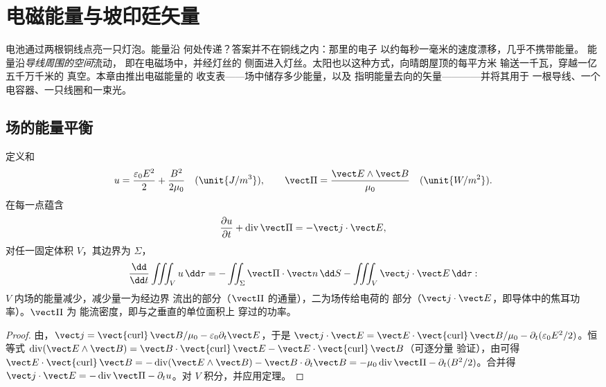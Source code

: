 \chapter{电磁能量与坡印廷矢量}\label{ch:b2:poynting-vector}

电池通过两根铜线点亮一只灯泡。能量沿
何处传递？答案并不在铜线之内：那里的电子
以约每秒一毫米的速度漂移，几乎不携带能量。
能量沿\emph{导线周围的空间}流动，
即在电磁场中，并经灯丝的
侧面进入灯丝。太阳也以这种方式，向晴朗屋顶的每平方米
输送一千瓦，穿越一亿五千万千米的
真空。本章由推出电磁能量的
收支表——场中储存多少能量，以及
指明能量去向的矢量————并将其用于
一根导线、一个电容器、一只线圈和一束光。

\section{场的能量平衡}

\begin{theorem}[坡印廷定理]\label{thm:b2:poynting-vector:poynting}
定义\emph{}和\emph{}
\[
u = \frac{\varepsilon_0E^2}2 + \frac{B^2}{2\mu_0} \quad (\unit{J/m^3}) , \qquad
\vect\Pi = \frac{\vect E\wedge\vect B}{\mu_0} \quad (\unit{W/m^2}) .
\]
在每一点蕴含
\[
\frac{\partial u}{\partial t} + \operatorname{div}\vect\Pi = -\vect j\cdot\vect E ,
\]
对任一固定体积 $V$，其边界为 $\Sigma$，
\[
\frac{\dd}{\dd t}\iiint_Vu\,\dd\tau = -\iint_\Sigma\vect\Pi\cdot\vect n\,\dd S - \iiint_V\vect j\cdot\vect E\,\dd\tau :
\]
$V$ 内场的能量减少，减少量一为经边界
流出的部分（$\vect\Pi$ 的通量），二为场传给电荷的
部分（$\vect j\cdot\vect E$，即导体中的焦耳功率）。$\vect\Pi$ 为
能流密度，即与之垂直的单位面积上
穿过的功率。
\end{theorem}

\begin{proof}
由，$\vect j = \operatorname{\vect{curl}}\vect B/\mu_0 - \varepsilon_0\partial_t
\vect E$，于是 $\vect j\cdot\vect E = \vect E\cdot\operatorname{\vect{curl}}\vect B/\mu_0 -
\partial_t(\varepsilon_0E^2/2)$。恒等式 $\operatorname{div}(\vect E\wedge\vect B) = \vect B
\cdot\operatorname{\vect{curl}}\vect E - \vect E\cdot\operatorname{\vect{curl}}\vect B$（可逐分量
验证），由可得 $\vect E\cdot\operatorname{\vect{curl}}
\vect B = -\operatorname{div}(\vect E\wedge\vect B) - \vect B\cdot\partial_t\vect B = -\mu_0
\operatorname{div}\vect\Pi - \partial_t(B^2/2)$。合并得 $\vect j\cdot\vect E = -\operatorname{div}
\vect\Pi - \partial_tu$。对 $V$ 积分，并应用定理。
\end{proof}

